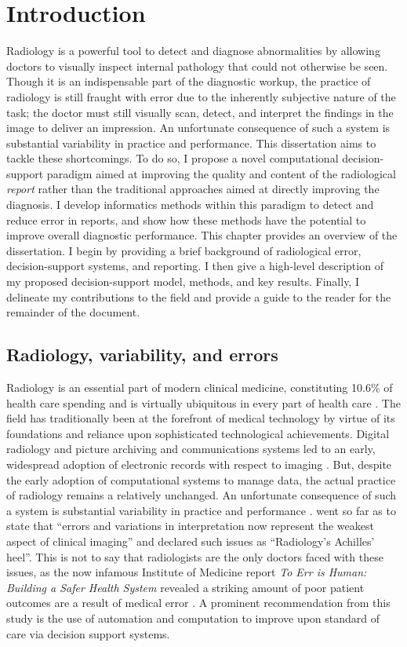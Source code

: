 \chapter{Introduction}
Radiology is a powerful tool to detect and diagnose abnormalities by allowing doctors to visually inspect internal pathology that could not otherwise be seen. Though it is an indispensable part of the diagnostic workup, the practice of radiology is still fraught with error due to the inherently subjective nature of the task; the doctor must still visually scan, detect, and interpret the findings in the image to deliver an impression. An unfortunate consequence of such a system is substantial variability in practice and performance. This dissertation aims to tackle these shortcomings. To do so, I propose a novel computational decision-support paradigm aimed at improving the quality and content of the radiological \emph{report} rather than the traditional approaches aimed at directly improving the diagnosis. I develop informatics methods within this paradigm to detect and reduce error in reports, and show how these methods have the potential to improve overall diagnostic performance. This chapter provides an overview of the dissertation. I begin by providing a brief background of radiological error, decision-support systems, and reporting. I then give a high-level description of my proposed decision-support model, methods, and key results. Finally, I delineate my contributions to the field and provide a guide to the reader for the remainder of the document.



\section*{Radiology, variability, and errors}
Radiology is an essential part of modern clinical medicine, constituting 10.6\% of health care spending and is virtually ubiquitous in every part of health care \cite{Dodoo:tg}. The field has traditionally been at the forefront of medical technology by virtue of its foundations and reliance upon sophisticated technological achievements. Digital radiology and picture archiving and communications systems led to an early, widespread adoption of electronic records with respect to imaging \cite{Strickland:2000cv,Bryan:1999kn}. But, despite the early adoption of computational systems to manage data, the actual practice of radiology remains a relatively unchanged. An unfortunate consequence of such a system is substantial variability in practice and performance \cite{Fitzgerald:2001hn}.  went so far as to state that ``errors and variations in interpretation now represent the weakest aspect of clinical imaging'' and declared such issues as ``Radiology's Achilles' heel''. This is not to say that radiologists are the only doctors faced with these issues, as the now infamous Institute of Medicine report \emph{To Err is Human: Building a Safer Health System} revealed a striking amount of poor patient outcomes are a result of medical error \cite{Anonymous:2000va}. A prominent recommendation from this study is the use of automation and computation to improve upon standard of care via decision support systems.

